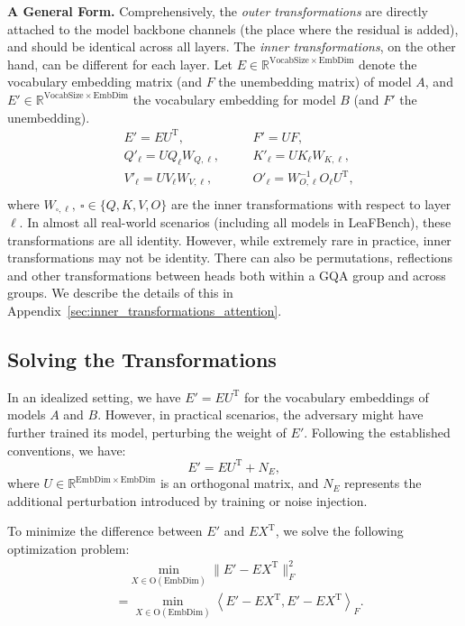 \documentclass{article} %
\begin{document}
\textbf{A General Form.}
Comprehensively, the \textit{outer transformations} are directly attached to the model backbone channels (the place where the residual is added), and should be identical across all layers. 
The \textit{inner transformations}, on the other hand, can be different for each layer.
Let $E \in \mathbb{R}^{\mathrm{VocabSize} \times \mathrm{EmbDim}}$ denote the vocabulary embedding matrix (and $F$ the unembedding matrix) of model $A$,  
and $E' \in \mathbb{R}^{\mathrm{VocabSize} \times \mathrm{EmbDim}}$ the vocabulary embedding for model $B$ (and $F'$ the unembedding).
\[
\begin{aligned}
    &E' = E U^{\text{T}}, \quad &&F' = U F, \\
    &Q'_\ell = U Q_\ell W_{Q, \ell}, \quad &&K'_\ell = U K_\ell W_{K, \ell}, \\
    &V'_\ell = U V_\ell W_{V, \ell}, \quad &&O'_\ell = W^{-1}_{O, \ell} O_\ell U^{\text{T}},\\
\end{aligned}
\]
where $W_{\square, \ell}, \ \square \in \{Q, K, V, O\}$ are the inner transformations with respect to layer $\ell$. In almost all real-world scenarios (including all models in LeaFBench), these transformations are all identity. However, while extremely rare in practice, inner transformations may not be identity. There can also be permutations, reflections and other transformations between heads both within a GQA group and across groups. We describe the details of this in Appendix~\ref{sec:inner_transformations_attention}.

\subsection{Solving the Transformations}
In an idealized setting, we have $E' = E U^{\text{T}}$ for the vocabulary embeddings of models $A$ and $B$. 
However, in practical scenarios, the adversary might have further trained its model, perturbing the weight of $E'$.
Following the established conventions, we have:
\[
E' = E U^{\text{T}} + N_E,
\]
where $U \in \mathbb{R}^{\mathrm{EmbDim} \times \mathrm{EmbDim}}$ is an orthogonal matrix,  
and $N_E$ represents the additional perturbation introduced by training or noise injection.

To minimize the difference between $E'$ and $E X^{\text{T}}$, we solve the following optimization problem:
\[
\begin{aligned}
&\quad\min_{X \in \mathrm{O}(\mathrm{EmbDim})} \lVert E' - E X^{\text{T}} \rVert_F^2 \\
&= \min_{X \in \mathrm{O}(\mathrm{EmbDim})} \left\langle E' - E X^{\text{T}}, E' - E X^{\text{T}} \right\rangle_F.
\end{aligned}
\]
\end{document}
